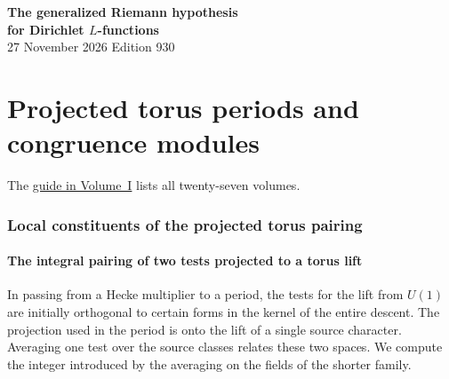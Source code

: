\documentclass[a4paper,11pt]{article}
\theoremstyle{definition}
\theoremstyle{remark}
\numberwithin{equation}{section}
\begin{document}
\setcounter{part}{9}
\thispagestyle{plain}\begin{center}
{\LARGE\bfseries The generalized Riemann hypothesis\\[2pt]for Dirichlet \(L\)-functions}\\[6pt]
{\small 27 November 2026 \quad\textperiodcentered\quad Edition 930}\end{center}
\part{Projected torus periods and congruence modules}\label{part:X}
\begin{abstract}\noindent Local inertia characters and crystalline flags enter the projected torus pairing. We compare cup-product bounds over the period fields and relate the integral period to the Hecke congruence module.\end{abstract}
\setcounter{section}{49}
\noindent The \hyperref[seriesguide]{guide in Volume~I} lists all twenty-seven volumes.
\begingroup\small\setlength{\parskip}{0pt}\tableofcontents\endgroup
\clearpage

\section{Local constituents of the projected torus pairing}\label{nav:torus-constituents}\label{nav:volume-X}

\subsection{The integral pairing of two tests projected to a torus lift}
\label{sec:rankonepair736}

In passing from a Hecke multiplier to a period, the tests for the
lift from \(U(1)\) are initially orthogonal to certain forms in the
kernel of the entire descent. The projection used in the period is
onto the lift of a single source character. Averaging one test over
the source classes relates these two spaces. We compute the integer
introduced by the averaging on the fields of the shorter family.
\end{document}
